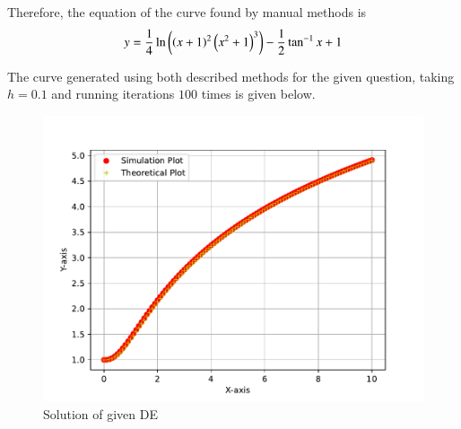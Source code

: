 \documentclass[journal]{IEEEtran}
\begin{document}
Therefore, the equation of the curve found by manual methods is
\begin{align}
y = \frac{1}{4}\ln{\ensuremath{\left(\left(x+1\right)^2\left(x^2+1\right)^3\right)}} - \frac{1}{2}\tan^{-1}{x} + 1
\end{align}

\newpage

The curve generated using both described methods for the given question, taking $h=0.1$ and running iterations $100$ times is given below.

\begin{figure}[h]
	\centering
	\includegraphics[width=\columnwidth]{figs/fig.pdf}
	\caption{Solution of given DE}
	\label{fig}
\end{figure}
\end{document}
